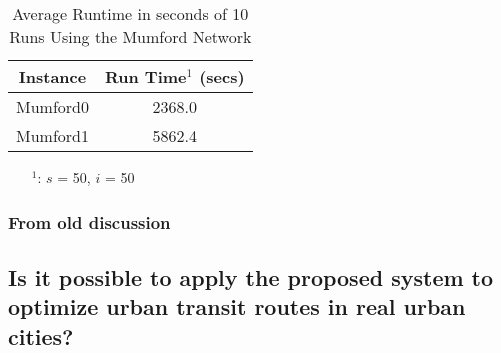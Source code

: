 
\begin{table}[H]
    \centering
    \hspace*{-1.0cm}
    \begin{tabular}{|c|c|}
        \hline
        \textbf{Instance} & \textbf{Run Time$^1$ (secs)} \\
        \hline
        Mumford0 & 2368.0\\
        \hline
        Mumford1 & 5862.4\\
        \hline
    \end{tabular}
    \caption{Average Runtime in seconds of 10 Runs Using the Mumford Network}
    \label{tabel:runTimeMumford}
    \begin{itemize}[noitemsep]
    \item[$^1$:] $s$ = 50, $i$ = 50
    \end{itemize} 
\end{table}






\subsubsection{From old discussion}


\subsection*{Is it possible to apply the proposed system to optimize urban transit routes in real urban cities?}

